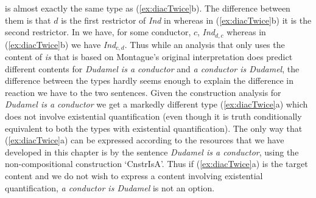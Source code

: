  is almost exactly the same type as (\ref{ex:diacTwice}b).
The difference between them is that $d$ is the first restrictor of
\textit{Ind} in  whereas in (\ref{ex:diacTwice}b) it is
the second restrictor.   In  we have, for some conductor,
$c$, \textit{Ind}$_{d,c}$ whereas in (\ref{ex:diacTwice}b) we have
\textit{Ind}$_{c,d}$.  Thus while an analysis that only uses the content of
\textit{is} that is based on Montague's original interpretation does
predict different contents for \textit{Dudamel is a conductor} and
\textit{a conductor is Dudamel}, the difference between the types
hardly seems enough to explain the difference in reaction we have to
the two sentences.  Given the construction analysis for
\textit{Dudamel is a conductor} we get a markedly different type
(\ref{ex:diacTwice}a) which
does not involve existential quantification (even though it is truth
conditionally equivalent to both the types with existential
quantification). The only way that  (\ref{ex:diacTwice}a) can be
expressed according to the resources that we have developed in this
chapter is by the sentence \textit{Dudamel is a conductor}, using the
non-compositional construction `CnstrIsA'.  Thus if
(\ref{ex:diacTwice}a) is the target content and we do not wish to
express a content involving existential quantification, \textit{a
  conductor is Dudamel} is not an option.  

